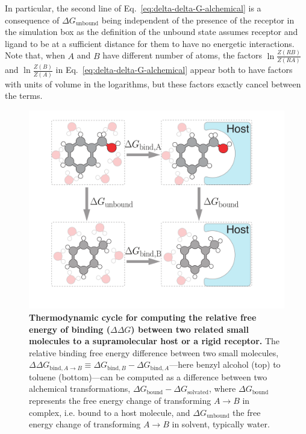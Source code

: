 \documentclass[9pt,bestpractices]{livecoms}
\begin{document}
In particular, the second line of Eq.~\ref{eq:delta-delta-G-alchemical} is a consequence of $\Delta G_{\mathrm{unbound}}$ being independent of the presence of the receptor in the simulation box as the definition of the unbound state assumes receptor and ligand to be at a sufficient distance for them to have no energetic interactions.
Note that, when $A$ and $B$ have different number of atoms, the factors $ \ln \frac{Z(RB)}{Z(RA)}$ and $\ln \frac{Z(B)}{Z(A)}$ in   Eq.~\ref{eq:delta-delta-G-alchemical} appear both to have factors with units of volume in the logarithms, but these factors exactly cancel between the terms.

\begin{figure}
    \includegraphics[width=0.95\linewidth]{figures/fig2_therm_cyc/Figure.pdf}
    \caption{{\bf Thermodynamic cycle for computing the relative free energy of binding ($\Delta \Delta G$) between two related small molecules to a supramolecular host or a rigid receptor.}
    The relative binding free energy difference between two small molecules, $\Delta \Delta G_{\mathrm{bind}, A \rightarrow B} \equiv \Delta G_{\mathrm{bind}, B} - \Delta G_{\mathrm{bind}, A}$---here benzyl alcohol (top) to toluene (bottom)---can be computed as a difference between two alchemical transformations, $\Delta G_\mathrm{bound} - \Delta G_\mathrm{solvated}$, where $\Delta G_\mathrm{bound}$ represents the free energy change of transforming $A \rightarrow B$ in complex, i.e. bound to a host molecule, and $\Delta G_\mathrm{unbound}$ the free energy change of transforming $A \rightarrow B$ in solvent, typically water.}
    \label{fig:fig_binding_thermodynamic_cycle}
\end{figure}
\end{document}
